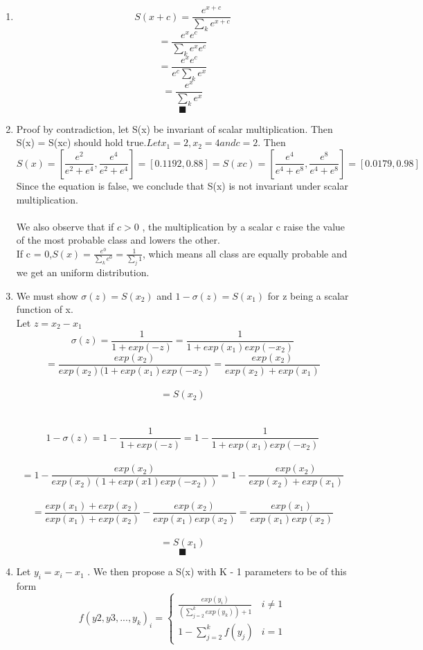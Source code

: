 \documentclass{article}
\begin{document}
\begin{enumerate}
     \item 
	$$ S(x+c) = \frac{e^{x+c}}{\sum_k e^{x + c}}$$ $$ = \frac{e^x e^c}{\sum_k e^{x} e^{c}}$$ $$= \frac{e^x e^c}{e^{c}\sum_k e^{x}}$$ $$ =  \frac{e^x}{\sum_k e^{x}}$$
	$$\blacksquare$$

    \item 
	Proof by contradiction, let S(x) be invariant of scalar multiplication. Then S(x) = S(xc) should hold true.$ Let x_1 = 2 , x_2 = 4 and c = 2$. Then 
	$$ S(x) = [\frac{e^2}{e^2 + e^4}, \frac{e^4}{e^2 + e^4}]  = [0.1192,0.88] = S(xc) =  [\frac{e^4}{e^4 + e^8}, \frac{e^8}{e^4 + e^8}] = [0.0179,0.98]$$
	Since the equation is false, we conclude that S(x) is not invariant under scalar multiplication.\\ \\
	We also observe that if $c > 0$ , the multiplication by a scalar c raise the value of the most probable class and lowers the other.\\
	If c = 0,$ S(x) = \frac{e^0}{\sum_k e^0} = \frac{1}{\sum_j 1}$, which means all class are equally probable and we get an uniform distribution.\\

    \item
	We must show $\sigma(z) = S(x_2)$ and $1 - \sigma(z) = S(x_1)$ for z being a scalar function of x.\\

	Let $z = x_2 - x_1$\\
	$$\sigma(z) = \frac{1}{1 + exp(-z)} = \frac{1}{1 + exp(x_1)exp(-x_2)}$$ $$ = \frac{exp(x_2)}{exp(x_2)( 1 + exp(x_1)exp(-x_2)} = \frac{exp(x_2)}{exp(x_2) + exp(x_1)} $$ \\		$$= S(x_2)$$\\ \\

	$$1 - \sigma(z) = 1 - \frac{1}{1 + exp(-z)} = 1 - \frac{1}{1 + exp(x_1)exp(-x_2)}$$\\
	$$ = 1 - \frac{exp(x_2)}{exp(x_2)(1 + exp(x1)exp(-x_2))}  = 1 - \frac{exp(x_2)}{exp(x_2) + exp(x_1)}$$\\
	$$ = \frac{exp(x_1) + exp(x_2)}{exp(x_1) + exp(x_2)} - \frac{exp(x_2)}{exp(x_1)exp(x_2)} = \frac{exp(x_1)}{exp(x_1)exp(x_2)}$$\\
	$$ = S(x_1)$$
	$$\blacksquare$$

    \item 
	Let $y_i = x_i - x_1$ . We then propose a S(x) with K - 1 parameters to be of this form
	\[ 
	 f(y2,y3,...,y_k)_i = 
	\begin{cases} 
      \frac{exp(y_i)}{(\sum^k_{j=2} exp(y_k)) + 1} & i  \neq 1 \\
      1 - \sum^k_{j=2} f(y_j) & i=1
   \end{cases}
\]


\end{enumerate}
\end{document}
